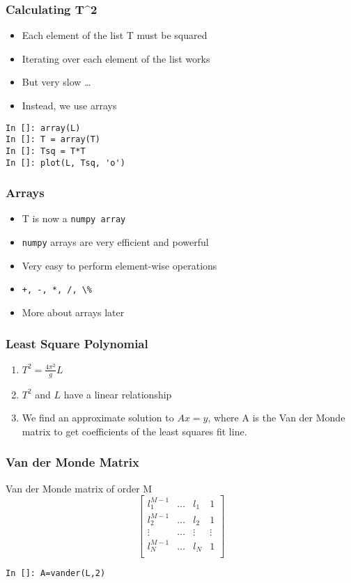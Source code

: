 \documentclass[14pt,compress]{beamer}
\newcommand{\typ}[1]{\lstinline{#1}}
\begin{document}
\begin{frame}[fragile]
\frametitle{Calculating T^2}
\begin{itemize}
\item Each element of the list T must be squared
\item Iterating over each element of the list works
\item But very slow \ldots
\item Instead, we use arrays
\end{itemize}
\begin{lstlisting}
In []: array(L)
In []: T = array(T)
In []: Tsq = T*T
In []: plot(L, Tsq, 'o')
\end{lstlisting}
\end{frame}

\begin{frame}[fragile]
\frametitle{Arrays}
\begin{itemize}
\item T is now a \typ{numpy array}
\item \typ{numpy} arrays are very efficient and powerful 
\item Very easy to perform element-wise operations
\item \typ{+, -, *, /, \%}
\item More about arrays later
\end{itemize}
\end{frame}

\begin{frame}[fragile]
\frametitle{Least Square Polynomial}
\begin{enumerate}
\item $T^2 = \frac{4\pi^2}{g}L$
\item $T^2$ and $L$ have a linear relationship
\item We find an approximate solution to $Ax = y$, where A is the Van der Monde matrix to get coefficients of the least squares fit line. 
\end{enumerate}
\end{frame}

\begin{frame}[fragile]
\frametitle{Van der Monde Matrix}
Van der Monde matrix of order M
\begin{equation*}
  \begin{bmatrix}
  l_1^{M-1} & \ldots & l_1 & 1 \\
  l_2^{M-1} & \ldots &l_2 & 1 \\
  \vdots & \ldots & \vdots & \vdots\\
  l_N^{M-1} & \ldots & l_N & 1 \\
  \end{bmatrix}
\end{equation*}
\begin{lstlisting}
In []: A=vander(L,2)
\end{lstlisting}
\end{frame}
\end{document}
